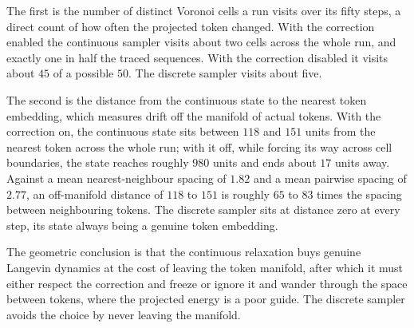 The first is the number of distinct Voronoi cells a run visits over its fifty steps, a direct count of how often the projected token changed. With the correction enabled the continuous sampler visits about two cells across the whole run, and exactly one in half the traced sequences.
With the correction disabled it visits about $45$ of a possible $50$.
The discrete sampler visits about five.

The second is the distance from the continuous state to the nearest token embedding, which measures drift off the manifold of actual tokens. With the correction on, the continuous state sits between $118$ and $151$ units from the nearest token across the whole run; with it off, while forcing its way across cell boundaries, the state reaches roughly $980$ units and ends about $17$ units away.
Against a mean nearest-neighbour spacing of $1.82$ and a mean pairwise spacing of $2.77$, an off-manifold distance of $118$ to $151$ is roughly $65$ to $83$ times the spacing between neighbouring tokens. The discrete sampler sits at distance zero at every step, its state always being a genuine token embedding.

The geometric conclusion is that the continuous relaxation buys genuine Langevin dynamics at the cost of leaving the token manifold, after which it must either respect the correction and freeze or ignore it and wander through the space between tokens, where the projected energy is a poor guide. The discrete sampler avoids the choice by never leaving the manifold.

